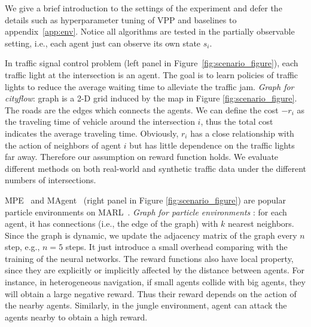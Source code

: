 \documentclass[11pt,a4paper]{article}
\theoremstyle{definition}
\begin{document}
We give a brief introduction to the settings of the experiment and defer the details such as hyperparameter tuning of VPP and baselines to appendix~\ref{app:env}. Notice all algorithms are tested in the partially observable setting, i.e., each agent just can observe its own state $s_i$.

In traffic signal control problem (left panel in Figure~\ref{fig:scenario_figure}), each traffic light at the intersection is an agent. The goal is to learn policies of traffic lights to reduce the average waiting time to alleviate the traffic jam. \emph{Graph for cityflow}: graph is a 2-D grid induced by the map in Figure \ref{fig:scenario_figure}. The  roads are the edges which connects the agents.  We can define the cost $-r_i$ as the traveling time of vehicle around the intersection $i$, thus the total cost indicates the average traveling time. Obviously, $r_i$ has a close relationship with the action of neighbors of agent $i$ but has little dependence on the traffic lights far away. Therefore our assumption on reward function holds. 
We evaluate different methods on both real-world and synthetic traffic data under the different numbers of intersections.

MPE~\citep{mordatch2017emergence} and MAgent~\citep{zheng2018magent} (right panel in Figure \ref{fig:scenario_figure}) are popular particle environments on MARL~\citep{lowe2017multi, jiang2020graph}.  \emph{Graph for particle environments } : for each agent, it has connections (i.e., the edge of the graph) with  $k$ nearest neighbors. Since the graph is dynamic, we update the adjacency matrix of the graph every $n$ step, e.g., $n=5$ steps. It  just introduce a small overhead comparing with the training of the neural networks.   The reward functions also have local property, since they are explicitly or implicitly affected by the distance between agents. For instance, in heterogeneous navigation,  if small agents collide with big agents, they will obtain a large negative reward. Thus their reward depends on the action of the nearby agents. Similarly, in the jungle environment, agent can attack the agents nearby  to obtain a high reward.
\end{document}

